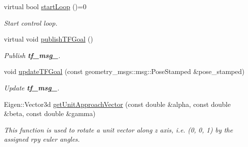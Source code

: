 \begin{DoxyCompactItemize}
virtual bool \hyperlink{classArmControlBase_adcee7690990e054f03b146f769d77859}{start\+Loop} ()=0
\begin{DoxyCompactList}\small\item\em Start control loop. \end{DoxyCompactList}\item 
\mbox{\label{classArmControlBase_a0e24e2e79df13e918e1ef317c4ac2ec1}} 
virtual void \hyperlink{classArmControlBase_a0e24e2e79df13e918e1ef317c4ac2ec1}{publish\+T\+F\+Goal} ()
\begin{DoxyCompactList}\small\item\em Publish {\bfseries tf\+\_\+msg\+\_\+}. \end{DoxyCompactList}\item 
void \hyperlink{classArmControlBase_a81f9e2c00abd1eb665e3cca3e11972ab}{update\+T\+F\+Goal} (const geometry\+\_\+msgs\+::msg\+::\+Pose\+Stamped \&pose\+\_\+stamped)
\begin{DoxyCompactList}\small\item\em Update {\bfseries tf\+\_\+msg\+\_\+}. \end{DoxyCompactList}\item 
Eigen\+::\+Vector3d \hyperlink{classArmControlBase_aca29358591477ee195f01748266d7e9b}{get\+Unit\+Approach\+Vector} (const double \&alpha, const double \&beta, const double \&gamma)
\begin{DoxyCompactList}\small\item\em This function is used to rotate a unit vector along z axis, i.\+e. (0, 0, 1) by the assigned rpy euler angles. \end{DoxyCompactList}\end{DoxyCompactItemize}
